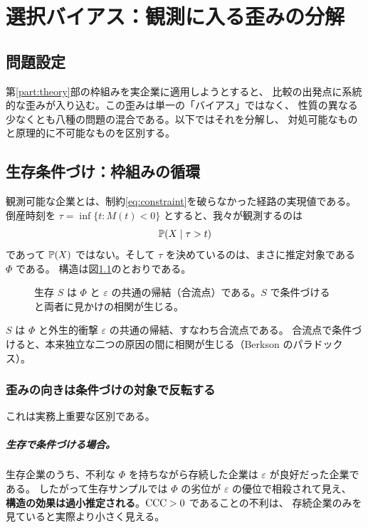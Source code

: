\chapter{選択バイアス：観測に入る歪みの分解}
\label{ch:method}

\section{問題設定}

第\ref{part:theory}部の枠組みを実企業に適用しようとすると、
比較の出発点に系統的な歪みが入り込む。この歪みは単一の「バイアス」ではなく、
性質の異なる少なくとも八種の問題の混合である。以下ではそれを分解し、
対処可能なものと原理的に不可能なものを区別する。

\section{生存条件づけ：枠組みの循環}
\label{sec:survivorship}

観測可能な企業とは、制約\eqref{eq:constraint}を破らなかった経路の実現値である。
倒産時刻を $\tau=\inf\{t:M(t)<0\}$ とすると、我々が観測するのは
\begin{equation}
\mathbb{P}(X \mid \tau > t)
\end{equation}
であって $\mathbb{P}(X)$ ではない。そして $\tau$ を決めているのは、まさに推定対象である $\Phi$ である。
構造は図\ref{fig:dag}のとおりである。

\begin{figure}[htbp]
\centering
{}
\caption{生存 $S$ は $\Phi$ と $\varepsilon$ の共通の帰結（合流点）である。$S$ で条件づけると両者に見かけの相関が生じる。}
\label{fig:dag}
\end{figure}

$S$ は $\Phi$ と外生的衝撃 $\varepsilon$ の共通の帰結、すなわち合流点である。
合流点で条件づけると、本来独立な二つの原因の間に相関が生じる（Berkson のパラドックス）。

\subsection{歪みの向きは条件づけの対象で反転する}

これは実務上重要な区別である。

\paragraph{生存で条件づける場合。}
生存企業のうち、不利な $\Phi$ を持ちながら存続した企業は $\varepsilon$ が良好だった企業である。
したがって生存サンプルでは $\Phi$ の劣位が $\varepsilon$ の優位で相殺されて見え、
\textbf{構造の効果は過小推定される}。$\mathrm{CCC}>0$ であることの不利は、
存続企業のみを見ていると実際より小さく見える。


